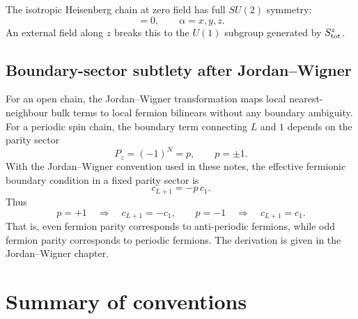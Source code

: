 The isotropic Heisenberg chain at zero field has full $SU(2)$ symmetry:
\begin{equation}
    [H_{\rm Heis},S_{\rm tot}^\alpha]=0,
    \qquad
    \alpha=x,y,z.
\end{equation}
An external field along $z$ breaks this to the $U(1)$ subgroup generated by
$S_{\rm tot}^z$.

\subsection{Boundary-sector subtlety after Jordan--Wigner}

For an open chain, the Jordan--Wigner transformation maps local nearest-neighbour
bulk terms to local fermion bilinears without any boundary ambiguity. For a
periodic spin chain, the boundary term connecting $L$ and $1$ depends on the parity
sector
\begin{equation}
    P_z=(-1)^N=p,
    \qquad
    p=\pm1.
\end{equation}
With the Jordan--Wigner convention used in these notes, the effective fermionic
boundary condition in a fixed parity sector is
\begin{equation}
\label{eq:chapter-effective-boundary-condition}
    c_{L+1}=-p\,c_1.
\end{equation}
Thus
\begin{equation}
    p=+1
    \quad\Longrightarrow\quad
    c_{L+1}=-c_1,
    \qquad
    p=-1
    \quad\Longrightarrow\quad
    c_{L+1}=c_1.
\end{equation}
That is, even fermion parity corresponds to anti-periodic fermions, while odd
fermion parity corresponds to periodic fermions. The derivation is given in the
Jordan--Wigner chapter.

\section{Summary of conventions}

